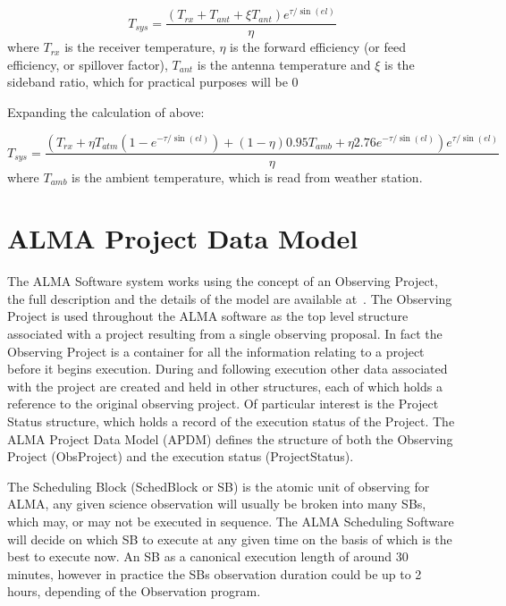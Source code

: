 \begin{enumerate}
$$
T_{sys} = \frac {\left ( T_{rx} + T_{ant} + \xi T_{ant} \right ) e^{\tau / \sin(el)}}
{\eta}
$$
where $T_{rx}$ is the receiver temperature, $\eta$ is the forward efficiency (or
feed efficiency, or spillover factor), $T_{ant}$ is the antenna temperature and $\xi$
is the sideband ratio, which for practical purposes will be $0$

Expanding the calculation of above:

$$
T_{sys} = \frac{\left ( T_{rx} + \eta T_{atm} \left ( 1 - e^{-\tau/\sin(el)} \right ) + (1 - \eta) 0.95 T_{amb} + \eta 2.76 e^{-\tau/\sin(el)} \right )  e^{\tau / \sin(el)}}
{\eta}
$$
where $T_{amb}$ is the ambient temperature, which is read from weather station.
\end{enumerate}


\section{ALMA Project Data Model}
\label{sec:apdm}
The ALMA Software system works using the concept of an Observing Project, the full description and the details of the model are available at~\cite{apdm-model}. The Observing Project is used throughout the ALMA software as the top level structure associated with a project resulting from a single observing proposal. In fact the Observing Project is a container for all the information relating to a project before it begins execution. During and following execution other data associated with the project are created and held in other structures, each of which holds a reference to the original observing project. Of particular interest is the Project Status structure, which holds a record of the execution status of the Project. The ALMA Project Data Model (APDM) defines the structure of both the Observing Project (ObsProject) and the execution status (ProjectStatus).

The Scheduling Block (SchedBlock or SB) is the atomic unit of observing for ALMA, any given science observation will usually be broken into many SBs, which may, or may not be executed in sequence. The ALMA Scheduling Software will decide on which SB to execute at any given time on the basis of which is the best to execute now. An SB as a canonical execution length of around 30 minutes, however in practice the SBs observation duration could be up to 2 hours, depending of the Observation program.

